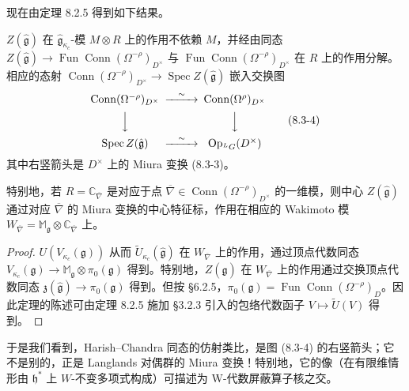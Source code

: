 现在由定理 8.2.5 得到如下结果。

\begin{theorem}
    $Z(\hat{\mathfrak g})$ 在 $\hat{\mathfrak g}_{\kappa_c}$-模 $M\otimes R$ 上的作用不依赖 $M$，并经由同态 $Z(\hat{\mathfrak g})\to\operatorname{Fun}\operatorname{Conn}(\Omega^{-\rho})_{D^\times}$ 与 $\operatorname{Fun}\operatorname{Conn}(\Omega^{-\rho})_{D^\times}$ 在 $R$ 上的作用分解。相应的态射 $\operatorname{Conn}(\Omega^{-\rho})_{D^\times}\to\operatorname{Spec}Z(\hat{\mathfrak g})$ 嵌入交换图
    \begin{equation}
    \begin{CD}
    \operatorname{Conn}(\Omega^{-\rho})_{D^\times} @>{\sim}>> \operatorname{Conn}(\Omega^{\rho})_{D^\times}\\
    @VVV @VVV\\
    \operatorname{Spec}Z(\hat{\mathfrak g}) @>{\sim}>> \operatorname{Op}_{{}^LG}(D^\times)
    \end{CD}
    \tag{8.3-4}
    \end{equation}
    其中右竖箭头是 $D^\times$ 上的 Miura 变换 (8.3-3)。

    特别地，若 $R=\mathbb C_{\overline\nabla}$ 是对应于点 $\overline\nabla\in\operatorname{Conn}(\Omega^{-\rho})_{D^\times}$ 的一维模，则中心 $Z(\hat{\mathfrak g})$ 通过对应 $\overline\nabla$ 的 Miura 变换的中心特征标，作用在相应的 Wakimoto 模 $W_{\overline\nabla}=\mathbb M_{\mathfrak g}\otimes\mathbb C_{\overline\nabla}$ 上。
\end{theorem}

\begin{proof}
$U(V_{\kappa_c}(\mathfrak g))$ 从而 $\widetilde U_{\kappa_c}(\hat{\mathfrak g})$ 在 $W_{\overline\nabla}$ 上的作用，通过顶点代数同态 $V_{\kappa_c}(\mathfrak g)\to\mathbb M_{\mathfrak g}\otimes\pi_0(\mathfrak g)$ 得到。特别地，$Z(\hat{\mathfrak g})$ 在 $W_{\overline\nabla}$ 上的作用通过交换顶点代数同态 $\mathfrak z(\hat{\mathfrak g})\to\pi_0(\mathfrak g)$ 得到。但按 §6.2.5，$\pi_0(\mathfrak g)=\operatorname{Fun}\operatorname{Conn}(\Omega^{-\rho})_D$。因此定理的陈述可由定理 8.2.5 施加 §3.2.3 引入的包络代数函子 $V\mapsto\widetilde U(V)$ 得到。
\end{proof}

于是我们看到，Harish--Chandra 同态的仿射类比，是图 (8.3-4) 的右竖箭头；它不是别的，正是 Langlands 对偶群的 Miura 变换！特别地，它的像（在有限维情形由 $\mathfrak h^*$ 上 $W$-不变多项式构成）可描述为 W-代数屏蔽算子核之交。

